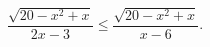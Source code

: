 \begin{ex}[type=inequality]
	\begin{condition}
		$ \dfrac{\sqrt{20 - x^2 + x}}{2x - 3}\leqslant\dfrac{\sqrt{20 - x^2 + x}}{x - 6}.$
	\end{condition}
	\answer{ $ x \in\{-4;5\}\cup[-3;1,5).$}
\end{ex}